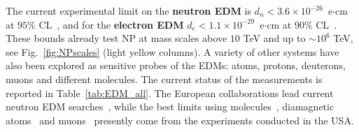 
The current experimental limit on the {\bf neutron EDM} is
$d_n < 3.6 \times 10^{-26}$~e$\cdot$cm at $95\%$ CL~\cite{Chupp:2017rkp},
and for the {\bf electron EDM} $d_e < 1.1 \times 10^{-29}$~e$\cdot$cm at $90\%$
CL~\cite{Andreev:2018ayy}.  
These bounds already test NP at mass scales above $10$ TeV and up to $\sim 10^6$ TeV, see  Fig.~\ref{fig:NPscales} (light yellow columns).  
A variety of other systems 
have also been explored as sensitive probes 
of the EDMs: atoms, protons,  deuterons, muons and different molecules. The current status of the measurements is reported in   Table~\ref{tab:EDM_all}.
The European collaborations lead current neutron EDM searches~\cite{Afach:2015sja}, while the best limits using molecules~\cite{Andreev:2018ayy}, 
diamagnetic atoms~\cite{Graner:2016ses} and 
muons~\cite{Bennett:2008dy} presently come from the experiments conducted in the USA. 

